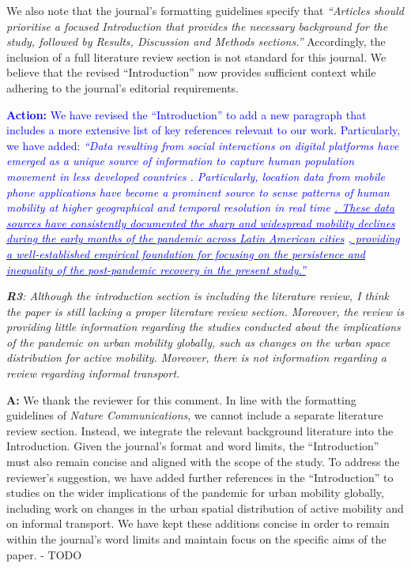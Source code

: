 \documentclass[12pt,a4paper,oneside, reqno]{amsart}
\begin{document}
We also note that the journal’s formatting guidelines specify that \textit{``Articles should prioritise a focused Introduction that provides the necessary background for the study, followed by Results, Discussion and Methods sections.''} Accordingly, the inclusion of a full literature review section is not standard for this journal. We believe that the revised ``Introduction'' now provides sufficient context while adhering to the journal’s editorial requirements.

\textcolor{blue}{
\textbf{Action:} We have revised the ``Introduction'' to add a new paragraph that includes a more extensive list of key references relevant to our work. Particularly, we have added: \textit{``Data resulting from social interactions on digital platforms have emerged as a unique source of information to capture human population movement in less developed countries \parencite{rowe2023big}. Particularly, location data from mobile phone applications have become a prominent source to sense patterns of human mobility at higher geographical and temporal resolution in real time \parencite{calafiore2023, iradukunda2025}\ul{. These data sources have consistently documented the sharp and widespread mobility declines during the early months of the pandemic across Latin American cities} \parencite{RoweCCA24, covidMexico24, elejalde2024, demography25}\ul{, providing a well-established empirical foundation for focusing on the persistence and inequality of the post-pandemic recovery in the present study.''}}
}

\setlength{\leftskip}{1cm} \textit{\textbf{R3}: Although the introduction section is including the literature review, I think the paper is still lacking a proper literature review section. Moreover, the review is providing little information regarding the studies conducted about the implications of the pandemic on urban mobility globally, such as changes on the urban space distribution for active mobility. Moreover, there is not information regarding a review regarding informal transport.}

\setlength{\leftskip}{1cm}\textbf{A:}  We thank the reviewer for this comment. In line with the formatting guidelines of \textit{Nature Communications}, we cannot include a separate literature review section. Instead, we integrate the relevant background literature into the Introduction. Given the journal’s format and word limits, the ``Introduction'' must also remain concise and aligned with the scope of the study. To address the reviewer’s suggestion, we have added further references in the ``Introduction'' to studies on the wider implications of the pandemic for urban mobility globally, including work on changes in the urban spatial distribution of active mobility and on informal transport. We have kept these additions concise in order to remain within the journal’s word limits and maintain focus on the specific aims of the paper. - TODO
\end{document}
